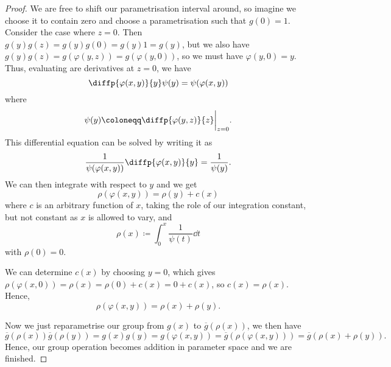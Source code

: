 \documentclass[fleqn]{NotesClass}
\begin{document}
\begin{thm}{}{}
\begin{proof}
            We are free to shift our parametrisation interval around, so imagine we choose it to contain zero and choose a parametrisation such that \(g(0) = 1\).
            Consider the case where \(z = 0\).
            Then \(g(y)g(z) = g(y)g(0) = g(y)1 = g(y)\), but we also have \(g(y)g(z) = g(\varphi(y, z)) = g(\varphi(y, 0))\), so we must have \(\varphi(y, 0) = y\).
            Thus, evaluating are derivatives at \(z = 0\), we have
            \begin{equation}
                \diffp{\varphi(x, y)}{y} \psi(y) = \psi(\varphi(x, y))
            \end{equation}
            where
            \begin{equation}
                \psi(y) \coloneqq \diffp{\varphi(y, z)}{z} \bigg|_{z = 0}.
            \end{equation}
            This differential equation can be solved by writing it as
            \begin{equation}
                \frac{1}{\psi(\varphi(x, y))} \diffp{\varphi(x, y)}{y} = \frac{1}{\psi(y)}.
            \end{equation}
            We can then integrate with respect to \(y\) and we get
            \begin{equation}
                \rho(\varphi(x, y)) = \rho(y) + c(x)
            \end{equation}
            where \(c\) is an arbitrary function of \(x\), taking the role of our integration constant, but not constant as \(x\) is allowed to vary, and 
            \begin{equation}
                \rho(x) \coloneqq \int_0^x \frac{1}{\psi(t)} \dd{t}
            \end{equation}
            with \(\rho(0) = 0\).
            
            We can determine \(c(x)\) by choosing \(y = 0\), which gives \(\rho(\varphi(x, 0)) = \rho(x) = \rho(0) + c(x) = 0 + c(x)\), so \(c(x) = \rho(x)\).
            Hence,
            \begin{equation}
                \rho(\varphi(x, y)) = \rho(x) + \rho(y).
            \end{equation}
            
            Now we just reparametrise our group from \(g(x)\) to \(\overbar{g}(\rho(x))\), we then have
            \begin{equation}
                \overbar{g}(\rho(x))\overbar{g}(\rho(y)) = g(x)g(y) = g(\varphi(x, y)) = \overbar{g}(\rho(\varphi(x, y))) = \overbar{g}(\rho(x) + \rho(y)).
            \end{equation}
            Hence, our group operation becomes addition in parameter space and we are finished.
        \end{proof}
    \end{thm}
    
\end{document}

